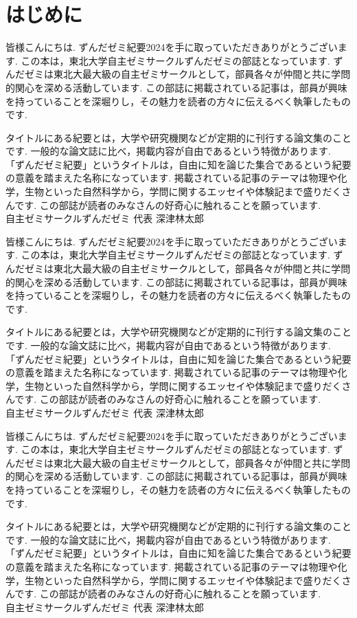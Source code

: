 
\chapter*{はじめに}

皆様こんにちは. 
ずんだゼミ紀要2024を手に取っていただきありがとうございます. 
この本は，東北大学自主ゼミサークルずんだゼミの部誌となっています. 
ずんだゼミは東北大最大級の自主ゼミサークルとして，部員各々が仲間と共に学問的関心を深める活動しています. 
この部誌に掲載されている記事は，部員が興味を持っていることを深堀りし，その魅力を読者の方々に伝えるべく執筆したものです. 

タイトルにある紀要とは，大学や研究機関などが定期的に刊行する論文集のことです. 
一般的な論文誌に比べ，掲載内容が自由であるという特徴があります. 
「ずんだゼミ紀要」というタイトルは，自由に知を論じた集合であるという紀要の意義を踏まえた名称になっています. 
掲載されている記事のテーマは物理や化学，生物といった自然科学から，学問に関するエッセイや体験記まで盛りだくさんです. 
この部誌が読者のみなさんの好奇心に触れることを願っています. \\

自主ゼミサークルずんだゼミ 代表 深津林太郎

皆様こんにちは. 
ずんだゼミ紀要2024を手に取っていただきありがとうございます. 
この本は，東北大学自主ゼミサークルずんだゼミの部誌となっています. 
ずんだゼミは東北大最大級の自主ゼミサークルとして，部員各々が仲間と共に学問的関心を深める活動しています. 
この部誌に掲載されている記事は，部員が興味を持っていることを深堀りし，その魅力を読者の方々に伝えるべく執筆したものです. 

タイトルにある紀要とは，大学や研究機関などが定期的に刊行する論文集のことです. 
一般的な論文誌に比べ，掲載内容が自由であるという特徴があります. 
「ずんだゼミ紀要」というタイトルは，自由に知を論じた集合であるという紀要の意義を踏まえた名称になっています. 
掲載されている記事のテーマは物理や化学，生物といった自然科学から，学問に関するエッセイや体験記まで盛りだくさんです. 
この部誌が読者のみなさんの好奇心に触れることを願っています. \\

自主ゼミサークルずんだゼミ 代表 深津林太郎

皆様こんにちは. 
ずんだゼミ紀要2024を手に取っていただきありがとうございます. 
この本は，東北大学自主ゼミサークルずんだゼミの部誌となっています. 
ずんだゼミは東北大最大級の自主ゼミサークルとして，部員各々が仲間と共に学問的関心を深める活動しています. 
この部誌に掲載されている記事は，部員が興味を持っていることを深堀りし，その魅力を読者の方々に伝えるべく執筆したものです. 

タイトルにある紀要とは，大学や研究機関などが定期的に刊行する論文集のことです. 
一般的な論文誌に比べ，掲載内容が自由であるという特徴があります. 
「ずんだゼミ紀要」というタイトルは，自由に知を論じた集合であるという紀要の意義を踏まえた名称になっています. 
掲載されている記事のテーマは物理や化学，生物といった自然科学から，学問に関するエッセイや体験記まで盛りだくさんです. 
この部誌が読者のみなさんの好奇心に触れることを願っています. \\

自主ゼミサークルずんだゼミ 代表 深津林太郎








